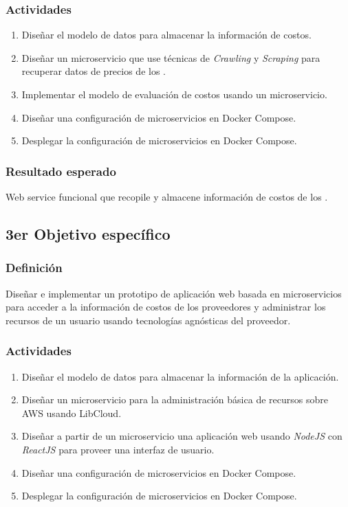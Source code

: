 \subsubsection{Actividades}
\begin{enumerate}
    \item Diseñar el modelo de datos para almacenar la información de costos.
    \item Diseñar un microservicio que use técnicas de \emph{Crawling} y \emph{Scraping} para recuperar datos de precios de los .
    \item Implementar el modelo de evaluación de costos usando un microservicio.
    \item Diseñar una configuración de microservicios en \gls{Docker Compose}.
    \item Desplegar la configuración de microservicios en \gls{Docker Compose}.
\end{enumerate}
\subsubsection{Resultado esperado}
Web service funcional que recopile y almacene información de costos de los .

\subsection{3er Objetivo específico}
\subsubsection{Definición}
Diseñar e implementar un prototipo de aplicación web basada en microservicios para acceder a la información de costos de los proveedores y administrar los recursos de un usuario usando tecnologías agnósticas del proveedor.
\subsubsection{Actividades}
\begin{enumerate}
    \item Diseñar el modelo de datos para almacenar la información de la aplicación.
    \item Diseñar un microservicio para la administración básica de recursos sobre \acrshort{AWS} usando \gls{LibCloud}.
    \item Diseñar a partir de un microservicio una aplicación web usando \emph{NodeJS} con \emph{ReactJS} para proveer una interfaz de usuario.
    \item Diseñar una configuración de microservicios en \gls{Docker Compose}.
    \item Desplegar la configuración de microservicios en \gls{Docker Compose}.
\end{enumerate}
